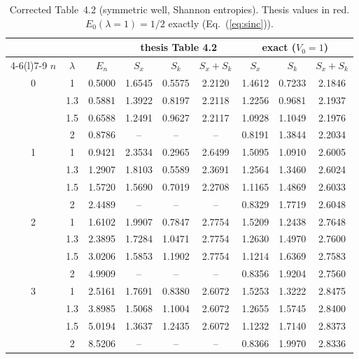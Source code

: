 \documentclass[11pt,a4paper]{article}
\newcommand{\Eq}[1]{Eq.~(#1)}
\newcommand{\Th}[1]{\textcolor{BrickRed}{#1}}
\begin{document}
\begin{table}[h]
\centering\small
\begin{tabular}{@{}cc c ccc ccc@{}}
\toprule
& & & \multicolumn{3}{c}{thesis Table 4.2} & \multicolumn{3}{c}{exact ($V_0=1$)}\\
\cmidrule(lr){4-6}\cmidrule(l){7-9}
$n$ & $\lambda$ & $E_n$ & $S_x$ & $S_k$ & $S_x+S_k$ & $S_x$ & $S_k$ & $S_x+S_k$\\
\midrule
0 & 1   & 0.5000 & \Th{1.6545} & \Th{0.5575} & \Th{2.2120} & 1.4612 & 0.7233 & 2.1846\\
  & 1.3 & 0.5881 & \Th{1.3922} & \Th{0.8197} & \Th{2.2118} & 1.2256 & 0.9681 & 2.1937\\
  & 1.5 & 0.6588 & \Th{1.2491} & \Th{0.9627} & \Th{2.2117} & 1.0928 & 1.1049 & 2.1976\\
  & 2   & 0.8786 & -- & -- & -- & 0.8191 & 1.3844 & 2.2034\\
1 & 1   & 0.9421 & \Th{2.3534} & \Th{0.2965} & \Th{2.6499} & 1.5095 & 1.0910 & 2.6005\\
  & 1.3 & 1.2907 & \Th{1.8103} & \Th{0.5589} & \Th{2.3691} & 1.2564 & 1.3460 & 2.6024\\
  & 1.5 & 1.5720 & \Th{1.5690} & \Th{0.7019} & \Th{2.2708} & 1.1165 & 1.4869 & 2.6033\\
  & 2   & 2.4489 & -- & -- & -- & 0.8329 & 1.7719 & 2.6048\\
2 & 1   & 1.6102 & \Th{1.9907} & \Th{0.7847} & \Th{2.7754} & 1.5209 & 1.2438 & 2.7648\\
  & 1.3 & 2.3895 & \Th{1.7284} & \Th{1.0471} & \Th{2.7754} & 1.2630 & 1.4970 & 2.7600\\
  & 1.5 & 3.0206 & \Th{1.5853} & \Th{1.1902} & \Th{2.7754} & 1.1214 & 1.6369 & 2.7583\\
  & 2   & 4.9909 & -- & -- & -- & 0.8356 & 1.9204 & 2.7560\\
3 & 1   & 2.5161 & \Th{1.7691} & \Th{0.8380} & \Th{2.6072} & 1.5253 & 1.3222 & 2.8475\\
  & 1.3 & 3.8985 & \Th{1.5068} & \Th{1.1004} & \Th{2.6072} & 1.2655 & 1.5745 & 2.8400\\
  & 1.5 & 5.0194 & \Th{1.3637} & \Th{1.2435} & \Th{2.6072} & 1.1232 & 1.7140 & 2.8373\\
  & 2   & 8.5206 & -- & -- & -- & 0.8366 & 1.9970 & 2.8336\\
\bottomrule
\end{tabular}
\caption{Corrected Table~4.2 (symmetric well, Shannon entropies). Thesis values in red.
$E_0(\lambda=1)=1/2$ exactly (\Eq{\ref{eq:sinc}}).}
\label{tab:w42}
\end{table}
\end{document}
